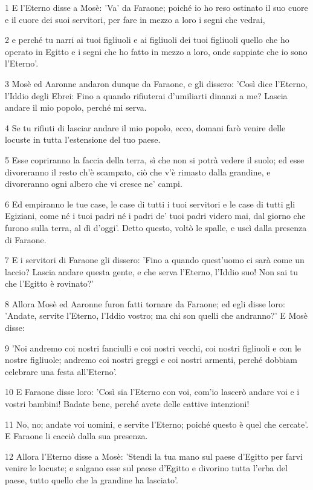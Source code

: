 \par 1 E l'Eterno disse a Mosè: 'Va' da Faraone; poiché io ho reso ostinato il suo cuore e il cuore dei suoi servitori, per fare in mezzo a loro i segni che vedrai,
\par 2 e perché tu narri ai tuoi figliuoli e ai figliuoli dei tuoi figliuoli quello che ho operato in Egitto e i segni che ho fatto in mezzo a loro, onde sappiate che io sono l'Eterno'.
\par 3 Mosè ed Aaronne andaron dunque da Faraone, e gli dissero: 'Così dice l'Eterno, l'Iddio degli Ebrei: Fino a quando rifiuterai d'umiliarti dinanzi a me? Lascia andare il mio popolo, perché mi serva.
\par 4 Se tu rifiuti di lasciar andare il mio popolo, ecco, domani farò venire delle locuste in tutta l'estensione del tuo paese.
\par 5 Esse copriranno la faccia della terra, sì che non si potrà vedere il suolo; ed esse divoreranno il resto ch'è scampato, ciò che v'è rimasto dalla grandine, e divoreranno ogni albero che vi cresce ne' campi.
\par 6 Ed empiranno le tue case, le case di tutti i tuoi servitori e le case di tutti gli Egiziani, come né i tuoi padri né i padri de' tuoi padri videro mai, dal giorno che furono sulla terra, al dì d'oggi'. Detto questo, voltò le spalle, e uscì dalla presenza di Faraone.
\par 7 E i servitori di Faraone gli dissero: 'Fino a quando quest'uomo ci sarà come un laccio? Lascia andare questa gente, e che serva l'Eterno, l'Iddio suo! Non sai tu che l'Egitto è rovinato?'
\par 8 Allora Mosè ed Aaronne furon fatti tornare da Faraone; ed egli disse loro: 'Andate, servite l'Eterno, l'Iddio vostro; ma chi son quelli che andranno?' E Mosè disse:
\par 9 'Noi andremo coi nostri fanciulli e coi nostri vecchi, coi nostri figliuoli e con le nostre figliuole; andremo coi nostri greggi e coi nostri armenti, perché dobbiam celebrare una festa all'Eterno'.
\par 10 E Faraone disse loro: 'Così sia l'Eterno con voi, com'io lascerò andare voi e i vostri bambini! Badate bene, perché avete delle cattive intenzioni!
\par 11 No, no; andate voi uomini, e servite l'Eterno; poiché questo è quel che cercate'. E Faraone li cacciò dalla sua presenza.
\par 12 Allora l'Eterno disse a Mosè: 'Stendi la tua mano sul paese d'Egitto per farvi venire le locuste; e salgano esse sul paese d'Egitto e divorino tutta l'erba del paese, tutto quello che la grandine ha lasciato'.
